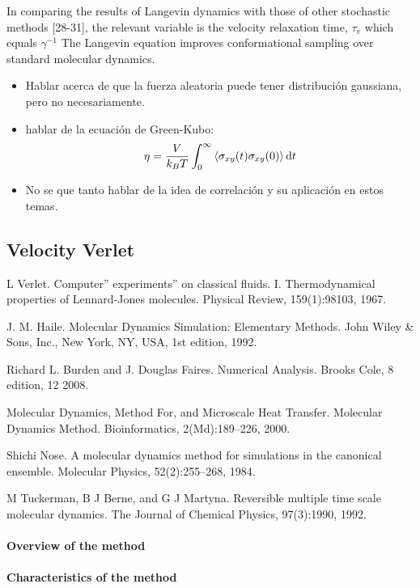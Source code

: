 In comparing the results of Langevin dynamics with those of other stochastic methods [28-31], the relevant variable is the velocity relaxation time, $\tau_{v}$ which equals $\gamma^{-1}$\citep{pastorTechniquesApplicationsLangevin1994}
The Langevin equation improves conformational sampling over standard molecular dynamics\citep{paquetMolecularDynamicsMonte2015}.

\begin{itemize}
    \item Hablar acerca de que la fuerza aleatoria puede tener distribución gaussiana, pero no necesariamente.
    \item hablar de la ecuación de Green-Kubo: \[\eta=\frac{V}{k_B T}\int_{0}^{\infty}\expval{\sigma_{xy}(t)\sigma_{xy}(0)}\mathrm{d}t\]
    \item No se que tanto hablar de la idea de correlación y su aplicación en estos temas.
\end{itemize}

\subsection{Velocity Verlet}

L Verlet. Computer” experiments” on classical fluids. I. Thermodynamical properties of Lennard-Jones molecules. Physical Review, 159(1):98103, 1967.

J. M. Haile. Molecular Dynamics Simulation: Elementary Methods.  John Wiley \& Sons, Inc., New York, NY, USA, 1st edition, 1992.

Richard L. Burden and J. Douglas Faires. Numerical Analysis. Brooks  Cole, 8 edition, 12 2008.

Molecular Dynamics, Method For, and Microscale Heat Transfer. Molecular Dynamics Method. Bioinformatics, 2(Md):189–226, 2000.

Shichi Nose. A molecular dynamics method for simulations in the canonical ensemble. Molecular Physics, 52(2):255–268, 1984.

M Tuckerman, B J Berne, and G J Martyna. Reversible multiple time  scale molecular dynamics. The Journal of Chemical Physics, 97(3):1990,  1992.



\paragraph{Overview of the method}

\paragraph{Characteristics of the method}


